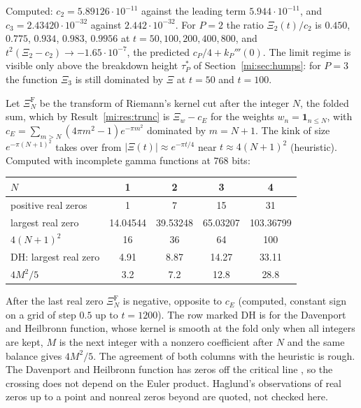 Computed: $c_2=5.89126\cdot10^{-11}$ against the leading term $5.944\cdot10^{-11}$, and $c_3=2.43420\cdot10^{-32}$ against $2.442\cdot10^{-32}$. For $P=2$ the ratio $\Xi_2(t)/c_2$ is $0.450$, $0.775$, $0.934$, $0.983$, $0.9956$ at $t=50,100,200,400,800$, and $t^2(\Xi_2-c_2)\to-1.65\cdot10^{-7}$, the predicted $c_P/4+k_P'''(0)$. The limit regime is visible only above the breakdown height $\tau_P^*$ of Section~\ref{mi:sec:humps}: for $P=3$ the function $\Xi_3$ is still dominated by $\Xi$ at $t=50$ and $t=100$.

Let $\Xi_N^{\mathrm F}$ be the transform of Riemann's kernel cut after the integer $N$, the folded sum, which by Result~\ref{mi:res:trunc} is $\Xi_w-c_E$ for the weights $w_n=\mathbf 1_{n\le N}$, with $c_E=\sum_{m>N}(4\pi m^2-1)e^{-\pi m^2}$ dominated by $m=N+1$. The kink of size $e^{-\pi(N+1)^2}$ takes over from $|\Xi(t)|\approx e^{-\pi t/4}$ near $t\approx4(N+1)^2$ (heuristic). Computed with incomplete gamma functions at $768$ bits:
\begin{center}
\begin{tabular}{lcccc}
\toprule
$N$ & 1 & 2 & 3 & 4 \\
\midrule
positive real zeros & 1 & 7 & 15 & 31 \\
largest real zero & 14.04544 & 39.53248 & 65.03207 & 103.36799 \\
$4(N+1)^2$ & 16 & 36 & 64 & 100 \\
\midrule
DH: largest real zero & 4.91 & 8.87 & 14.27 & 33.11 \\
$4M^2/5$ & 3.2 & 7.2 & 12.8 & 28.8 \\
\bottomrule
\end{tabular}
\end{center}
After the last real zero $\Xi_N^{\mathrm F}$ is negative, opposite to $c_E$ (computed, constant sign on a grid of step $0.5$ up to $t=1200$). The row marked DH is for the Davenport and Heilbronn function, whose kernel is smooth at the fold only when all integers are kept, $M$ is the next integer with a nonzero coefficient after $N$ and the same balance gives $4M^2/5$. The agreement of both columns with the heuristic is rough. The Davenport and Heilbronn function has zeros off the critical line \cite{DH36}, so the crossing does not depend on the Euler product. Haglund's observations of real zeros up to a point and nonreal zeros beyond \cite{Haglund09} are quoted, not checked here.

